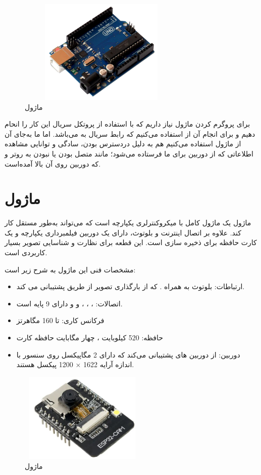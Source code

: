     \begin{figure}[!h]
	\centering
	\includegraphics[height=5cm,width=8cm]{./Images/CH3/Arduino_Uno.png}
	\caption{ماژول }
	\label{Arduino}
	\end{figure} 
برای پروگرم کردن ماژول  نیاز داریم که با استفاده از پروتکل سریال این کار را انحام دهیم و برای انجام آن از  استفاده می‌کنیم که رابط سریال به  می‌باشد. اما ما به‌جای آن از ماژول  استفاده می‌کنیم هم به دلیل دردسترس بودن، سادگی و توانایی مشاهده اطلاعاتی که از دوربین برای ما فرستاده می‌شود؛ مانند متصل بودن یا نبودن به روتر و  که دوربین روی آن بالا آمده‌است.
\section{ماژول }

ماژول  یک ماژول کامل با میکروکنترلری یکپارچه است که می‌تواند به‌طور مستقل کار کند. علاوه بر اتصال اینترنت و بلوتوث، دارای یک دوربین فیلمبرداری یکپارچه و یک کارت حافظه  برای ذخیره سازی است. این قطعه برای نظارت و شناسایی تصویر بسیار کاربردی است.

مشخصات فنی این ماژول به شرح زیر است:
\begin{itemize}
\item 
ارتباطات: بلوتوث  به همراه . که از بارگذاری تصویر از طریق  پشتیبانی می کند.
\item
اتصالات:  ،  ، ، و  و دارای 9 پایه  است.
\item
فرکانس کاری: تا 160 مگاهرتز
\item
حافظه: 520 کیلوبایت ، چهار مگابایت حافظه کارت 
\item
دوربین: از دوربین های  پشتیبانی می‌کند که دارای 2 مگاپیکسل روی سنسور با اندازه آرایه  1622 × 1200 پیکسل هستند.
\end{itemize}

    \begin{figure}[!h]
	\centering
	\includegraphics[height=4.3cm,width=6cm]{./Images/CH3/ESP32CAM.jpg}
	\caption{ماژول }
	\label{ESP32}
	\end{figure} 

